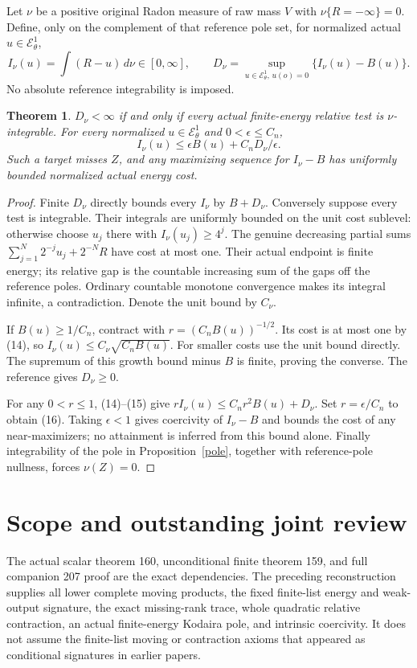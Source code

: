\documentclass[11pt]{article}
\newtheorem{theorem}{Theorem}
\newcommand{\EE}{\mathcal E^1_\theta}
\begin{document}
Let $\nu$ be a positive original Radon measure of raw mass $V$
with $\nu\{R=-\infty\}=0$. Define, only on the complement of
that reference pole set, for normalized actual $u\in\EE$,
\[
 I_\nu(u)=\int(R-u)\,d\nu\in[0,\infty],\qquad
 D_\nu=\sup_{u\in\EE,\,u(o)=0}\{I_\nu(u)-B(u)\}.       \tag{15}
\]
No absolute reference integrability is imposed.

\begin{theorem}\label{targets}
$D_\nu<\infty$ if and only if every actual finite-energy relative
test is $\nu$-integrable. For every normalized $u\in\EE$ and
$0<\epsilon\leq C_n$,
\[
 I_\nu(u)\leq\epsilon B(u)+C_nD_\nu/\epsilon.           \tag{16}
\]
Such a target misses $Z$, and any maximizing sequence for
$I_\nu-B$ has uniformly bounded normalized actual energy cost.
\end{theorem}
\begin{proof}
Finite $D_\nu$ directly bounds every $I_\nu$ by $B+D_\nu$.
Conversely suppose every test is integrable.
Their integrals are uniformly bounded on the unit cost sublevel:
otherwise choose $u_j$ there with $I_\nu(u_j)\geq4^j$.
The genuine decreasing partial sums
$\sum_{j=1}^N2^{-j}u_j+2^{-N}R$ have cost at most one.
Their actual endpoint is finite energy; its relative gap is the
countable increasing sum of the gaps off the reference poles.
Ordinary countable monotone convergence makes its integral infinite,
a contradiction. Denote the unit bound by $C_\nu$.

If $B(u)\geq1/C_n$, contract with
$r=(C_nB(u))^{-1/2}$. Its cost is at most one by (14), so
$I_\nu(u)\leq C_\nu\sqrt{C_nB(u)}$.
For smaller costs use the unit bound directly.
The supremum of this growth bound minus $B$ is finite, proving
the converse. The reference gives $D_\nu\geq0$.

For any $0<r\leq1$, (14)--(15) give
$rI_\nu(u)\leq C_n r^2B(u)+D_\nu$.
Set $r=\epsilon/C_n$ to obtain (16).
Taking $\epsilon<1$ gives coercivity of $I_\nu-B$ and bounds
the cost of any near-maximizers; no attainment is inferred from
this bound alone. Finally integrability of the pole in
Proposition~\ref{pole}, together with reference-pole nullness,
forces $\nu(Z)=0$.
\end{proof}

\section{Scope and outstanding joint review}
The actual scalar theorem 160, unconditional finite theorem 159,
and full companion 207 proof are the exact dependencies.
The preceding reconstruction supplies all lower complete moving
products, the fixed finite-list energy and weak-output signature,
the exact missing-rank trace, whole quadratic relative contraction,
an actual finite-energy Kodaira pole, and intrinsic coercivity.
It does not assume the finite-list moving or contraction axioms
that appeared as conditional signatures in earlier papers.
\end{document}
